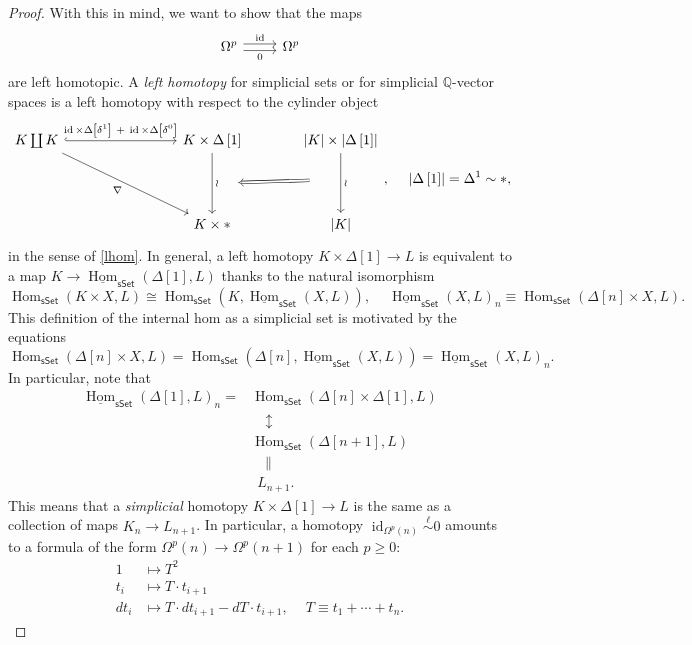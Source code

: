 \documentclass[10pt,letterpaper,cm]{nupset}
\theoremstyle{definition}
\theoremstyle{theorem}
\theoremstyle{remark}
\newcommand{\Q}{\mathbb Q}
\newcommand{\1}{\mathbb{1}}
\newcommand{\0}{\vec 0}
\DeclareMathOperator{\id}{id}
\DeclareMathOperator{\Hom}{Hom}
\begin{document}
\begin{proof}
With this in mind, we want to show that the maps
\[
\begin{tikzcd}
	{\Omega^p} & {\Omega^p}
	\arrow["\id", shift left=1, from=1-1, to=1-2]
	\arrow["0"', shift right=1, from=1-1, to=1-2]
\end{tikzcd}
\] are left homotopic. A \textit{left homotopy} for simplicial sets or for simplicial $\Q$-vector spaces is a left homotopy with respect to the cylinder object
\[
\begin{tikzcd}[column sep = large]
	{K \coprod K} & {} & {K \times \Delta\left[1\right]} & {\left\lvert{K}\right\rvert \times \left\lvert{\Delta\left[1\right]}\right\rvert} \\
	& {} && {} \\
	& {} & {K\times \ast} & {\left\lvert{K}\right\rvert}
	\arrow["{\id \times \Delta\left[\delta^1\right]\ +\ \id \times \Delta\left[\delta^0\right]}", hook, from=1-1, to=1-3]
	\arrow[""{name=0, anchor=center, inner sep=0}, "\wr", from=1-3, to=3-3]
	\arrow["\nabla"', from=1-1, to=3-3]
	\arrow["\wr", from=1-4, to=3-4]
	\arrow[shorten <=18pt, shorten >=18pt, Rightarrow, from=2-4, to=0]
\end{tikzcd}, \ \quad \left\lvert{\Delta\left[1\right]}\right\rvert  = \Delta^1 \sim \ast
,\] in the sense of \cref{lhom}. In general, a left homotopy $K \times \Delta\left[1\right] \to L$ is equivalent to a map \linebreak $K \to \underline{\Hom}_{\mathsf{sSet}}(\Delta\left[1\right], L)$ thanks to the natural isomorphism
\[
\Hom_{\mathsf{sSet}}(K \times X,L) \cong \Hom_{\mathsf{sSet}}(K, \underline{\Hom}_{\mathsf{sSet}}(X,L)), \ \quad  \underline{\Hom}_{\mathsf{sSet}}(X,L)_n \equiv \Hom_{\mathsf{sSet}}(\Delta\left[n\right] \times X, L)
.\] This definition of the internal hom as a simplicial set is motivated by the equations
\[
\Hom_{\mathsf{sSet}}(\Delta\left[n\right] \times X, L) = \Hom_{\mathsf{sSet}}(\Delta\left[n\right] , \underline{\Hom}_{\mathsf{sSet}}(X,L)) = \underline{\Hom}_{\mathsf{sSet}}(X,L)_n 
.\] In particular, note that 
\begin{align*}
\underline{\Hom}_{\mathsf{sSet}}(\Delta\left[1\right], L)_n  = &  \Hom_{\mathsf{sSet}}(\Delta\left[n\right] \times \Delta\left[1\right], L)
\\ &\quad  \updownarrow  \tag{EZ-AW}
\\ & \Hom_{\mathsf{sSet}}(\Delta\left[n+1\right], L) 
\\ & \quad  \parallel
\\ & \ \  L_{n+1}.
\end{align*}
This means that a \textit{simplicial} homotopy $K \times \Delta\left[1\right] \to L$ is the same as a collection of maps $K_n \to L_{n+1}$. In particular, a homotopy $\id_{\Omega^p(n)} \overset{\ell}{\sim} 0$ amounts to a formula of the form $\Omega^p(n) \to \Omega^p(n+1)$ for each $p\geq 0$:
\begin{align*}
1 & \mapsto T^2
\\ t_i & \mapsto T\cdot t_{i+1}
\\ d{t_i} & \mapsto T\cdot d{t_{i+1}} - d{T}\cdot t_{i+1}, \ \quad T \equiv t_1 + \cdots + t_n
.\end{align*}


\end{proof}
\end{document}
